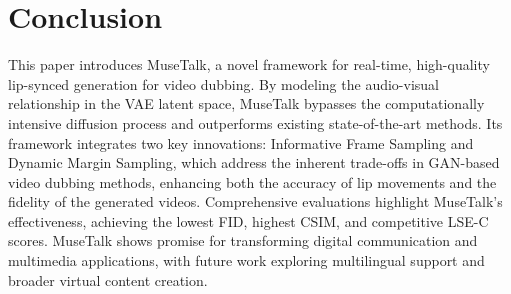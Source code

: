 \section{Conclusion}
\label{sec:conclusion}
This paper introduces MuseTalk, a novel framework for real-time, high-quality lip-synced generation for video dubbing. 
By modeling the audio-visual relationship in the VAE latent space, MuseTalk bypasses the computationally intensive diffusion process and outperforms existing state-of-the-art methods.
Its framework integrates two key innovations: Informative Frame Sampling and Dynamic Margin Sampling, which address the inherent trade-offs in GAN-based video dubbing methods, enhancing both the accuracy of lip movements and the fidelity of the generated videos. 
Comprehensive evaluations highlight MuseTalk's effectiveness, achieving the lowest FID, highest CSIM, and competitive LSE-C scores. 
MuseTalk shows promise for transforming digital communication and multimedia applications, with future work exploring multilingual support and broader virtual content creation.